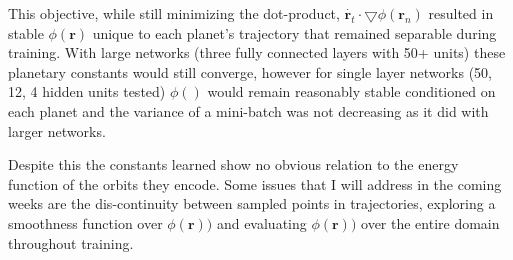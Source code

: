 \documentclass[10pt,letterpaper]{report}
\begin{document}
This objective, while still minimizing the dot-product, $\dot{\pmb{r}_t} \cdot \bigtriangledown \phi \left( \pmb{r}_n \right)$ resulted in stable $ \phi(\pmb{r})$ unique to each planet's trajectory that remained separable during training. With large networks (three fully connected layers with 50+ units) these planetary constants would still converge, however for single layer networks (50, 12, 4 hidden units tested) $\phi()$ would remain reasonably stable conditioned on each planet and the variance of a mini-batch was not decreasing as it did with larger networks.

Despite this the constants learned show no obvious relation to the energy function of the orbits they encode. Some issues that I will address in the coming weeks are the dis-continuity between sampled points in trajectories, exploring a smoothness function over $\phi(\pmb{r}))$ and evaluating $\phi(\pmb{r})) $ over the entire domain throughout training.
\end{document}
